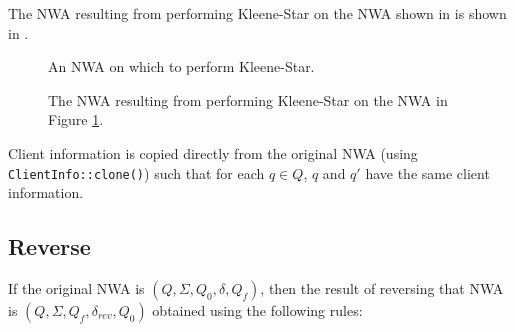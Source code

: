 The NWA resulting from performing Kleene-Star on the NWA shown in
 is shown in .

\begin{figure}[p]
  \centering
  \caption{An NWA on which to perform Kleene-Star.}
  \label{Fi:Star1}
\end{figure}

\begin{figure}[p]
  \centering
  \caption{The NWA resulting from performing Kleene-Star on the NWA in Figure \ref{Fi:Star1}.}
  \label{Fi:Star2}
\end{figure}

\goodbreak Client information is copied directly from the original NWA (using
\texttt{ClientInfo::clone()}) such that for each $q \in Q$, $q$
and $q'$ have the same client information.




\subsection{Reverse}
\label{Se:Reverse}



If the original NWA is $(Q, \Sigma, Q_0, \delta, Q_f)$, then the result of
reversing that NWA is $(Q, \Sigma, Q_f, \delta_{rev}, Q_0)$ obtained using
the following rules:



